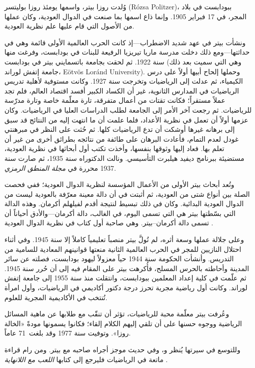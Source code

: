 \documentclass[../../../include/open-logic-section]{subfiles}
\begin{document}



وُلدت روزا بيتر، واسمها يومئذ روزا بوليتسر (R\'ozsa Politzer)، ببودابست
في بلاد المجر، في 17 فبراير 1905. وإنما ذاع اسمها بما صنعت في الدوال
العودية، وكان عملها من الأصول التي قام عليها علم نظرية العودية.

ونشأت بيتر في عهد شديد الاضطراب---إذ كانت الحرب العالمية الأولى قائمة
وهي في حداثتها---ومع ذلك دخلت مدرسة ماريا تيريزيا الرفيعة للبنات في
بودابست، وفرغت منها سنة 1922. ثم لحقت بجامعة باتسمايني بيتر في بودابست
(وهي التي سميت بعد ذلك جامعة إتفش لوراند، E\"otv\"os Lor\'and
University). وحملها إلحاح أبيها أولاً على درس الكيمياء، ثم عدلت إلى
الرياضيات وتخرجت سنة 1927. وكانت مستوفية لأهلية تدريس الرياضيات في
المدارس الثانوية، غير أن الكساد الكبير أفسد اقتصاد العالم، فلم تجد عملاً
مستقراً؛ فكانت تقتات من أعمال متفرقة، تارة معلّمة خاصة وتارة مدرّسة
للرياضيات. ثم رجعت آخر الأمر إلى الجامعة لطلب الدراسات العليا في
الرياضيات. وكان عزمها أولاً أن تعمل في نظرية الأعداد، فلما علمت أن ما
انتهت إليه من النتائج قد سبق إلى برهانه غيرها أوشكت أن تدع الرياضيات
كلها. ثم حُثت على النظر في مبرهنتي غودل لعدم التمام، فأعادت البرهان على
طائفة من نتائجه بطرائق أخرى من غير أن تعلم بها. فعاد إليها وثوقها بنفسها،
وأخذت تكتب أول أبحاثها في نظرية العودية، مستضيئة ببرنامج ديفيد هيلبرت
التأسيسي. ونالت الدكتوراه سنة 1935، ثم صارت سنة 1937 محررة في \emph{مجلة
المنطق الرمزي}.

وتُعد أبحاث بيتر الأولى من الأعمال المؤسسة لنظرية الدوال العودية؛ ففي
\cite{Peter1935a} فحصت الصلة بين أنواع شتى من العودية، ثم أثبتت في
\cite{Peter1935b} أن دالة معينة معرّفة بالعودية ليست من الدوال
العودية البدائية. وكان في ذلك تبسيط لنتيجة أقدم لفيلهلم أكرمان. وهذه
الدالة التي بسّطتها بيتر هي التي تسمى اليوم، في الغالب، دالة
أكرمان---والأدق أحياناً أن تسمى دالة أكرمان--بيتر. وهي صاحبة أول كتاب في
نظرية الدوال العودية \citep{Peter1951}.

وعلى جلالة عملها وسعة أثره، لم تُولَّ بيتر منصباً تعليمياً كاملاً إلا سنة
1945. وفي أثناء احتلال النازيين للمجر في الحرب العالمية الثانية منعتها
قوانينهم المعادية للسامية من التدريس. وأنشأت الحكومة سنة 1944 حياً معزولاً
ليهود بودابست، فصلته عن سائر المدينة وأحاطته بالحرس المسلح، فأُكرهت بيتر
على المقام فيه إلى أن حُرر سنة 1945. ثم علّمت في كلية إعداد المعلمين
ببودابست، وانتقلت منذ سنة 1955 إلى جامعة إتفش لوراند. وكانت أول رياضية
مجرية تحرز درجة دكتور أكاديمي في الرياضيات، وأول امرأة تُنتخب في
الأكاديمية المجرية للعلوم.

وعُرفت بيتر معلّمة محبة للرياضيات، تؤثر أن تنقّب مع طلابها عن ماهية
المسائل الرياضية ووجوه حسنها على أن تلقي إليهم الكلام إلقاء؛ فكانوا
يسمونها مودةً «الخالة روزا». وتوفيت سنة 1977 وقد بلغت~71 عاماً.

\begin{reading}
وللتوسع في سيرتها يُنظر \citep{Oconnor2014} و\citep{Andrasfai1986}، وفي
\citet{Tamassy1994} حديث موجز أجراه صاحبه مع بيتر. ومن رام قراءة ماتعة في
الرياضيات فليرجع إلى كتابها \emph{اللعب مع اللانهاية}
\citep{Peter2010}.
\end{reading}
\end{document}
